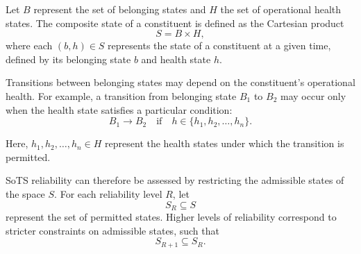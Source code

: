 Let \(B\) represent the set of belonging states and \(H\) the set of operational health states. The composite state of a constituent is defined as the Cartesian product
\[
S = B \times H,
\]
where each \((b,h) \in S\) represents the state of a constituent at a given time, defined by its belonging state \(b\) and health state \(h\).

Transitions between belonging states may depend on the constituent's operational health. For example, a transition from belonging state \(B_1\) to \(B_2\) may occur only when the health state satisfies a particular condition:
\[
B_1 \rightarrow B_2 \quad \text{if} \quad h \in \{h_1, h_2, \ldots, h_n\}.
\]

Here, \(h_1, h_2, \ldots, h_n \in H\) represent the health states under which the transition is permitted.

SoTS reliability can therefore be assessed by restricting the admissible states of the space \(S\).
For each reliability level \(R\), let
\[
S_R \subseteq S
\]
represent the set of permitted states. Higher levels of reliability correspond to stricter constraints on admissible states, such that
\[
S_{R+1} \subseteq S_R .
\]


